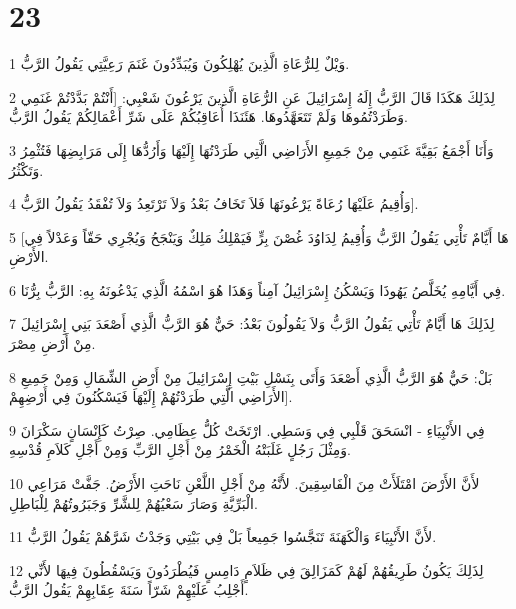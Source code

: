 \chapter{23}

\par 1 وَيْلٌ لِلرُّعَاةِ الَّذِينَ يُهْلِكُونَ وَيُبَدِّدُونَ غَنَمَ رَعِيَّتِي يَقُولُ الرَّبُّ.
\par 2 لِذَلِكَ هَكَذَا قَالَ الرَّبُّ إِلَهُ إِسْرَائِيلَ عَنِ الرُّعَاةِ الَّذِينَ يَرْعُونَ شَعْبِي: [أَنْتُمْ بَدَّدْتُمْ غَنَمِي وَطَرَدْتُمُوهَا وَلَمْ تَتَعَهَّدُوهَا. هَئَنَذَا أُعَاقِبُكُمْ عَلَى شَرِّ أَعْمَالِكُمْ يَقُولُ الرَّبُّ.
\par 3 وَأَنَا أَجْمَعُ بَقِيَّةَ غَنَمِي مِنْ جَمِيعِ الأَرَاضِي الَّتِي طَرَدْتُهَا إِلَيْهَا وَأَرُدُّهَا إِلَى مَرَابِضِهَا فَتُثْمِرُ وَتَكْثُرُ.
\par 4 وَأُقِيمُ عَلَيْهَا رُعَاةً يَرْعُونَهَا فَلاَ تَخَافُ بَعْدُ وَلاَ تَرْتَعِدُ وَلاَ تُفْقَدُ يَقُولُ الرَّبُّ].
\par 5 [هَا أَيَّامٌ تَأْتِي يَقُولُ الرَّبُّ وَأُقِيمُ لِدَاوُدَ غُصْنَ بِرٍّ فَيَمْلِكُ مَلِكٌ وَيَنْجَحُ وَيُجْرِي حَقّاً وَعَدْلاً فِي الأَرْضِ.
\par 6 فِي أَيَّامِهِ يُخَلَّصُ يَهُوذَا وَيَسْكُنُ إِسْرَائِيلُ آمِناً وَهَذَا هُوَ اسْمُهُ الَّذِي يَدْعُونَهُ بِهِ: الرَّبُّ بِرُّنَا.
\par 7 لِذَلِكَ هَا أَيَّامٌ تَأْتِي يَقُولُ الرَّبُّ وَلاَ يَقُولُونَ بَعْدُ: حَيٌّ هُوَ الرَّبُّ الَّذِي أَصْعَدَ بَنِي إِسْرَائِيلَ مِنْ أَرْضِ مِصْرَ.
\par 8 بَلْ: حَيٌّ هُوَ الرَّبُّ الَّذِي أَصْعَدَ وَأَتَى بِنَسْلِ بَيْتِ إِسْرَائِيلَ مِنْ أَرْضِ الشِّمَالِ وَمِنْ جَمِيعِ الأَرَاضِي الَّتِي طَرَدْتُهُمْ إِلَيْهَا فَيَسْكُنُونَ فِي أَرْضِهِمْ].
\par 9 فِي الأَنْبِيَاءِ - انْسَحَقَ قَلْبِي فِي وَسَطِي. ارْتَخَتْ كُلُّ عِظَامِي. صِرْتُ كَإِنْسَانٍ سَكْرَانَ وَمِثْلَ رَجُلٍ غَلَبَتْهُ الْخَمْرُ مِنْ أَجْلِ الرَّبِّ وَمِنْ أَجْلِ كَلاَمِ قُدْسِهِ.
\par 10 لأَنَّ الأَرْضَ امْتَلَأَتْ مِنَ الْفَاسِقِينَ. لأَنَّهُ مِنْ أَجْلِ اللَّعْنِ نَاحَتِ الأَرْضُ. جَفَّتْ مَرَاعِي الْبَرِّيَّةِ وَصَارَ سَعْيُهُمْ لِلشَّرِّ وَجَبَرُوتُهُمْ لِلْبَاطِلِ.
\par 11 لأَنَّ الأَنْبِيَاءَ وَالْكَهَنَةَ تَنَجَّسُوا جَمِيعاً بَلْ فِي بَيْتِي وَجَدْتُ شَرَّهُمْ يَقُولُ الرَّبُّ.
\par 12 لِذَلِكَ يَكُونُ طَرِيقُهُمْ لَهُمْ كَمَزَالِقَ فِي ظَلاَمٍ دَامِسٍ فَيُطْرَدُونَ وَيَسْقُطُونَ فِيهَا لأَنِّي أَجْلِبُ عَلَيْهِمْ شَرّاً سَنَةَ عِقَابِهِمْ يَقُولُ الرَّبُّ.
